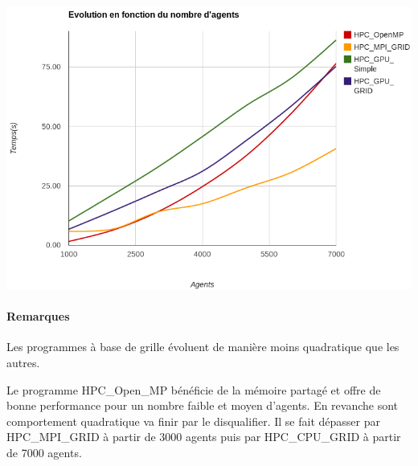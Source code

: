 \documentclass[liens,entete-ensimag,margeCorrection]{ensirapport}
\begin{document}
\includegraphics[width=\linewidth]{ImageGlobalLight}

\paragraph{Remarques}

Les programmes à base de grille évoluent de manière moins quadratique que les autres.

Le programme HPC\_Open\_MP bénéficie de la mémoire partagé et offre de bonne performance pour un nombre faible et moyen d'agents.
En revanche sont comportement quadratique va finir par le disqualifier.
Il se fait dépasser par HPC\_MPI\_GRID à partir de 3000 agents puis par HPC\_CPU\_GRID à partir de 7000 agents.
\end{document}
